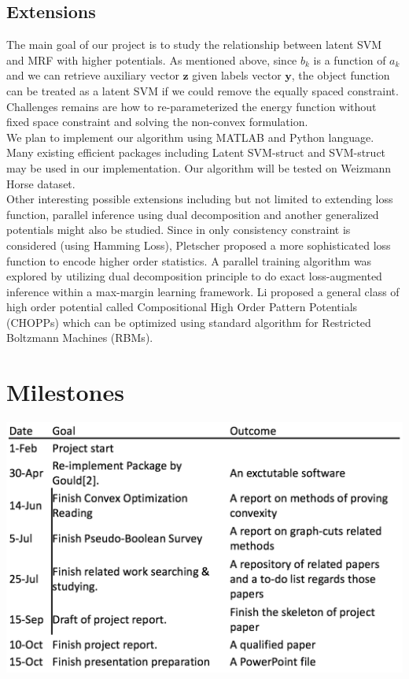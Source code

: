\documentclass{article}
\begin{document}
	\subsection{Extensions}
	
	The main goal of our project is to study the relationship between latent SVM and MRF with higher potentials. As mentioned above, since $b_k$ is a function of $a_k$ and we can retrieve auxiliary vector $\mathbf{z}$ given labels vector $\mathbf{y}$, the object function can be treated as a latent SVM if we could remove the equally spaced constraint.  Challenges remains are how to re-parameterized the energy function without fixed space constraint and solving the non-convex formulation. \\
	We plan to implement our algorithm using MATLAB and Python language. Many existing efficient packages including Latent SVM-struct\cite{yu2009learning} and SVM-struct\cite{tsochantaridis2005large} may be used in our implementation. Our algorithm will be tested on Weizmann Horse dataset\cite{borenstein2002class}\cite{borenstein2008combined}.\\
	Other interesting possible extensions including but not limited to extending loss function, parallel inference using dual decomposition and another generalized potentials might also be studied. Since in \cite{gouldlearning} only consistency constraint is considered (using Hamming Loss), Pletscher\cite{pletscher2012learning} proposed a more sophisticated loss function to encode  higher order statistics. 
	A parallel training algorithm was explored\cite{komodakis2014framework} by utilizing dual decomposition principle to do exact loss-augmented inference within a max-margin learning framework.
	 Li\cite{li2013exploring} proposed a general class of high order potential called Compositional High Order Pattern Potentials (CHOPPs) which can be optimized using standard algorithm for Restricted Boltzmann Machines (RBMs).\\
	 
	\section{Milestones}
	\includegraphics[scale = 0.6]{milestones.png}
	
	
	\renewcommand\refname{Bibliography}
	
	
\end{document}
